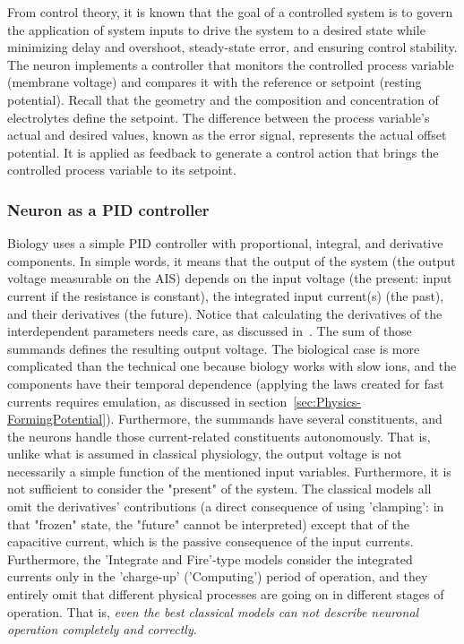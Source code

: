 From control theory, it is known that the goal of a controlled system is to
govern the application of system inputs to drive the system to a desired state while minimizing delay and overshoot, steady-state error, and ensuring control stability.
The neuron implements a controller that monitors the controlled process variable (membrane voltage) and compares it with the reference or setpoint (resting potential).
Recall that the geometry and the composition and concentration of electrolytes define the setpoint. 
The difference between the process variable's actual and desired values, known as the error signal, represents the actual offset potential.
It is applied as feedback to generate a control action that brings the controlled process variable to its setpoint.

\subsubsection{Neuron as a PID controller\label{Physics-PIDController}}

Biology uses a simple \gls{PID} controller with proportional, integral, and derivative components. 
In simple words, it means that the output of the system (the output voltage measurable on the \gls{AIS}) depends on the input voltage (the present: input current if the resistance is constant),
the integrated input current(s) (the past), and their derivatives (the future). Notice that calculating the derivatives of the interdependent parameters needs care, as discussed in~\cite{MechanicalPropertiesNerves:2025}. The sum of those summands defines the resulting output voltage. 
The biological case is more complicated than the technical one because biology works with slow ions, and the components have
their temporal dependence (applying the laws created for fast currents requires emulation, as discussed in section~\ref{sec:Physics-FormingPotential}). Furthermore, the summands have several constituents, and the neurons handle those current-related constituents autonomously.
That is, unlike what is assumed in classical physiology,
the output voltage is not necessarily a simple
function of the mentioned input variables.
Furthermore, it is not sufficient to consider the "present" of the system.
The classical models all omit the derivatives' contributions (a direct consequence of using 'clamping': in that "frozen" state, the "future" cannot be interpreted)
except that of the capacitive current, which is the passive consequence of the input currents.
Furthermore, the 'Integrate and Fire'-type models
consider the integrated currents only in the 'charge-up' ('Computing') period of operation, and they entirely omit that different physical processes are going on in different stages of operation.
That is, \textit{even the best classical models can not describe neuronal operation completely and correctly}.


